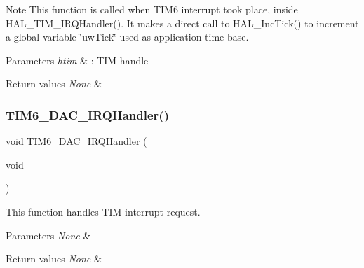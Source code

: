 \begin{DoxyNote}{Note}
This function is called when T\+I\+M6 interrupt took place, inside H\+A\+L\+\_\+\+T\+I\+M\+\_\+\+I\+R\+Q\+Handler(). It makes a direct call to H\+A\+L\+\_\+\+Inc\+Tick() to increment a global variable \char`\"{}uw\+Tick\char`\"{} used as application time base. 
\end{DoxyNote}

\begin{DoxyParams}{Parameters}
{\em htim} & \+: T\+IM handle \\
\hline
\end{DoxyParams}

\begin{DoxyRetVals}{Return values}
{\em None} & \\
\hline
\end{DoxyRetVals}
\mbox{\label{group___h_a_l___time_base___t_i_m_ga0839a45f331c4c067939b9c4533bbf4d}} 
\subsubsection{\texorpdfstring{T\+I\+M6\+\_\+\+D\+A\+C\+\_\+\+I\+R\+Q\+Handler()}{TIM6\_DAC\_IRQHandler()}}
{\footnotesize\ttfamily void T\+I\+M6\+\_\+\+D\+A\+C\+\_\+\+I\+R\+Q\+Handler (\begin{DoxyParamCaption}\item[{void}]{ }\end{DoxyParamCaption})}



This function handles T\+IM interrupt request. 


\begin{DoxyParams}{Parameters}
{\em None} & \\
\hline
\end{DoxyParams}

\begin{DoxyRetVals}{Return values}
{\em None} & \\
\hline
\end{DoxyRetVals}
